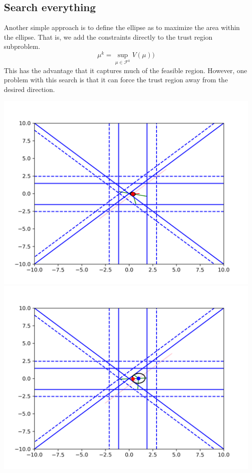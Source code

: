 \documentclass{article}
\begin{document}
\subsection{Search everything}
Another simple approach is to define the ellipse as to maximize the area within the ellipse.
That is, we add the constraints directly to the trust region subproblem.
$$\mu^k = \sup_{\mu \in \mathcal{F}^k} V(\mu))$$
This has the advantage that it captures much of the feasible region.
However, one problem with this search is that it can force the trust region away from the desired direction.

\includegraphics[scale=0.4]{everything_runs_1.png}
\includegraphics[scale=0.4]{everything_runs_2.png}
\end{document}
